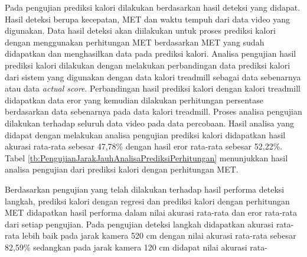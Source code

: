 Pada pengujian prediksi kalori dilakukan berdasarkan hasil deteksi yang didapat. Hasil deteksi berupa kecepatan, MET dan waktu tempuh dari data video yang digunakan. Data hasil deteksi akan diilakukan untuk proses prediksi kalori dengan menggunakan perhitungan MET berdasarkan MET yang sudah didapatkan dan menghasilkan data pada prediksi kalori. Analisa pengujian hasil prediksi kalori dilakukan dengan melakukan perbandingan data prediksi kalori dari sistem yang digunakan dengan data kalori treadmill sebagai data sebenarnya atau data \emph{actual score}. Perbandingan hasil prediksi kalori dengan kalori treadmill didapatkan data eror yang kemudian dilakukan perhitungan persentase berdasarkan data sebenarnya pada data kalori treadmill. Proses analisa pengujian dilakukan terhadap seluruh data video pada data percobaan. Hasil analisa yang didapat dengan melakukan analisa pengujian prediksi kalori didapatkan hasil akurasi rata-rata sebesar 47,78\% dengan hasil eror rata-rata sebesar 52,22\%. Tabel \ref{tb:PengujianJarakJauhAnalisaPrediksiPerhitungan} menunjukkan hasil analisa pengujian dari prediksi kalori dengan perhitungan MET.



Berdasarkan pengujian yang telah dilakukan terhadap hasil performa deteksi langkah, prediksi kalori dengan regresi dan prediksi kalori dengan perhitungan MET didapatkan hasil performa dalam nilai akurasi rata-rata dan eror rata-rata dari setiap pengujian. Pada pengujian deteksi langkah didapatkan akurasi rata-rata lebih baik pada jarak kamera 520 cm dengan nilai akurasi rata-rata sebesar 82,59\% sedangkan pada jarak kamera 120 cm didapat nilai akurasi rata-

